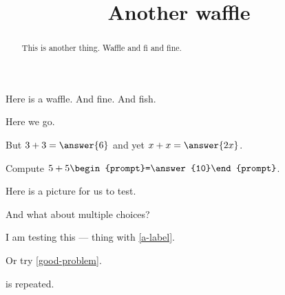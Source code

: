 \documentclass{ximera}
\title{Another waffle}
\begin{document}
\begin{abstract}
  This is another thing.  Waffle and fi and fine.
\end{abstract}
\maketitle

Here is a waffle.  And fine.  And fish.

Here we go.

\begin{problem}
  But $3 + 3 = \answer{6}$ and yet $x + x = \answer{2x}$.
\end{problem}

\begin{problem}
  Compute $5 + 5 \begin{prompt}=\answer{10}\end{prompt}$.
\end{problem}

Here is a picture for us to test.

\begin{image}
\end{image}
 
And what about multiple choices?
\begin{problem}
\begin{multipleChoice}
\end{multipleChoice}
\end{problem}

I am testing this ---
 thing with \ref{a-label}.

Or try \ref{good-problem}.

\begin{theorem}
  \label{thm:another}
\end{theorem}

\begin{corollary}
  \label{thm:whee} is repeated.
\end{corollary}
\end{document}
